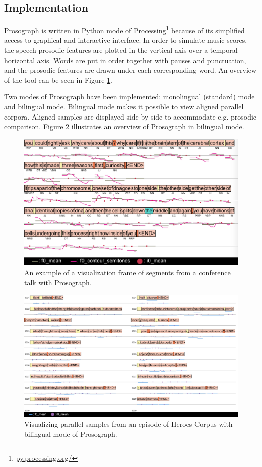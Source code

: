\subsection{Implementation}

Prosograph is written in Python mode of Processing\footnote{\url{py.processing.org/}} because of its simplified access to graphical and interactive interface. In order to simulate music scores, the speech prosodic features are plotted in the vertical axis over a temporal horizontal axis. Words are put in order together with pauses and punctuation, and the prosodic features are drawn under each corresponding word. An overview of the tool can be seen in Figure \ref{corpus:figure:prosograph_dump}.

Two modes of Prosograph have been implemented: monolingual (standard) mode and bilingual mode. Bilingual mode makes it possible to view aligned parallel corpora. Aligned samples are displayed side by side to accommodate e.g. prosodic comparison. Figure \ref{corpus:figure:prosograph2_dump} illustrates an overview of Prosograph in bilingual mode. 

\begin{figure}
\centering\includegraphics[width=\linewidth]{img/prosograph_dump_2.png}
\caption{An example of a visualization frame of segments from a conference talk with Prosograph.}
\label{corpus:figure:prosograph_dump}
\end{figure}

\begin{figure}
\centering\includegraphics[width=\linewidth]{img/prosograph2_dump.png}
\caption{Visualizing parallel samples from an episode of Heroes Corpus with bilingual mode of Prosograph.}
\label{corpus:figure:prosograph2_dump}
\end{figure}

